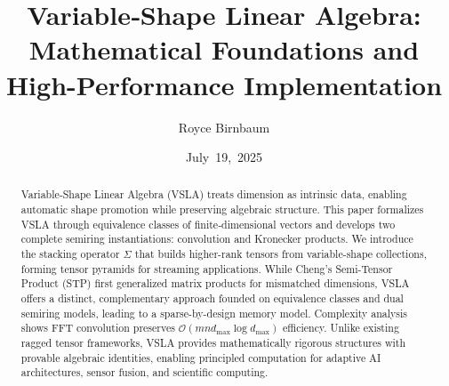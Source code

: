 \documentclass[11pt]{article}
\title{Variable‑Shape Linear Algebra: Mathematical Foundations and High-Performance Implementation}
\author{Royce Birnbaum}
\date{July 19, 2025}
\begin{document}
\maketitle

\begin{abstract}
Variable‑Shape Linear Algebra (VSLA) treats dimension as intrinsic data, enabling automatic shape promotion while preserving algebraic structure. This paper formalizes VSLA through equivalence classes of finite‑dimensional vectors and develops two complete semiring instantiations: convolution and Kronecker products. We introduce the stacking operator $\Sigma$ that builds higher-rank tensors from variable-shape collections, forming tensor pyramids for streaming applications. While Cheng's Semi-Tensor Product (STP) first generalized matrix products for mismatched dimensions, VSLA offers a distinct, complementary approach founded on equivalence classes and dual semiring models, leading to a sparse-by-design memory model. Complexity analysis shows FFT convolution preserves $\mathcal{O}(mn d_{\max} \log d_{\max})$ efficiency. Unlike existing ragged tensor frameworks, VSLA provides mathematically rigorous structures with provable algebraic identities, enabling principled computation for adaptive AI architectures, sensor fusion, and scientific computing.
\end{abstract}

\vspace{0.5em}
\noindent{}

\vspace{1em}
\noindent{}



















\end{document}
